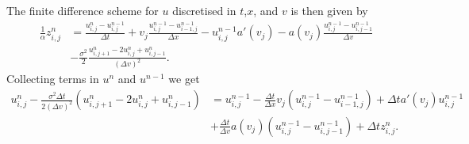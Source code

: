 The finite difference scheme for $u$ discretised in $t$,$x$, and $v$ is then given by 
%
\begin{align} 
    \frac{1}{\alpha}z^n_{i,j} &= \frac{u^n_{i,j}-u^{n-1}_{i,j}}{\Delta t} + v_j \frac{u^{n-1}_{i,j}-u^{n-1}_{i-1,j}}{\Delta x} - u^{n-1}_{i,j}a'(v_j) - a(v_j)\frac{u^{n-1}_{i,j}-u^{n-1}_{i,j-1}}{\Delta v}\\
     &- \frac{\sigma^2}{2}\frac{u^n_{i,j+1}-2u^n_{i,j}+u^n_{i,j-1}}{(\Delta v)^2}.
\end{align}
%
Collecting terms in $u^n$ and $u^{n-1}$ we get
%
\begin{align} 
    \label{eq:finite-difference}
    u^n_{i,j} - \frac{\sigma^2\Delta t}{2(\Delta v)^2}(u^n_{i,j+1}-2u^n_{i,j}+u^n_{i,j-1}) &= u^{n-1}_{i,j} - \frac{\Delta t}{\Delta x}v_j(u^{n-1}_{i,j}-u^{n-1}_{i-1,j}) + \Delta t a'(v_j) u^{n-1}_{i,j}\\ 
    &+ \frac{\Delta t}{\Delta v} a(v_j)(u^{n-1}_{i,j}-u^{n-1}_{i,j-1}) + \Delta t z^{n}_{i,j}.
\end{align}
%

